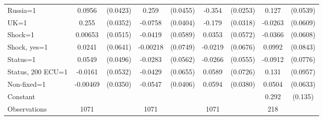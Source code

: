 \begin{tabular}{l|cccccc|cc}
Russia=1        &   0.0956\sym{**} & (0.0423)&    0.259\sym{***}& (0.0455)&   -0.354\sym{***}& (0.0253)&    0.127\sym{**} & (0.0539)\\
UK=1            &    0.255\sym{***}& (0.0352)&  -0.0758\sym{*}  & (0.0404)&   -0.179\sym{***}& (0.0318)&  -0.0263         & (0.0609)\\
Shock=1         &  0.00653         & (0.0515)&  -0.0419         & (0.0589)&   0.0353         & (0.0572)&  -0.0366         & (0.0608)\\
Shock, yes=1    &   0.0241         & (0.0641)& -0.00218         & (0.0749)&  -0.0219         & (0.0676)&   0.0992         & (0.0843)\\
Status=1        &   0.0549         & (0.0496)&  -0.0283         & (0.0562)&  -0.0266         & (0.0555)&  -0.0912         & (0.0776)\\
Status, 200 ECU=1&  -0.0161         & (0.0532)&  -0.0429         & (0.0655)&   0.0589         & (0.0726)&    0.131         & (0.0957)\\
Non-fixed=1     & -0.00469         & (0.0350)&  -0.0547         & (0.0406)&   0.0594         & (0.0380)&   0.0504         & (0.0633)\\
Constant        &                  &         &                  &         &                  &         &    0.292\sym{**} &  (0.135)\\
\hline
Observations    &     1071         &         &     1071         &         &     1071         &         &      218         &         \\


\end{tabular}
